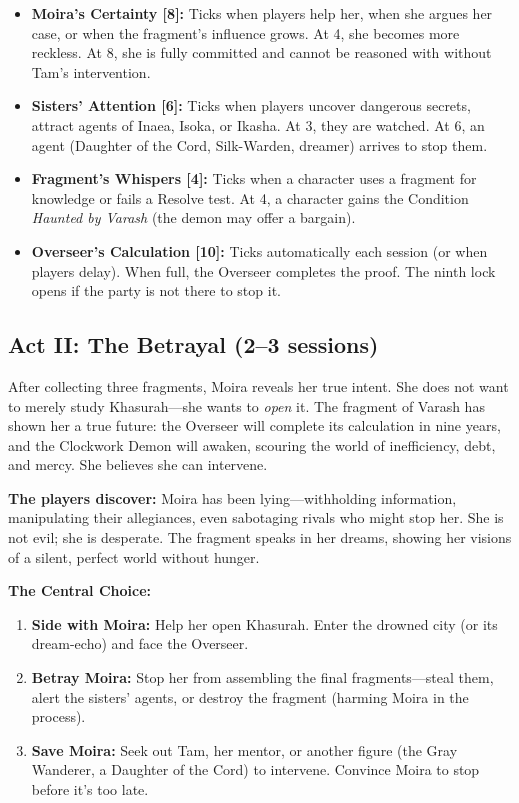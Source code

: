 \documentclass[11pt]{article}
\begin{document}
\begin{itemize}
    \item \textbf{Moira's Certainty [8]:} Ticks when players help her, when she argues her case, or when the fragment's influence grows. At 4, she becomes more reckless. At 8, she is fully committed and cannot be reasoned with without Tam's intervention.
    \item \textbf{Sisters' Attention [6]:} Ticks when players uncover dangerous secrets, attract agents of Inaea, Isoka, or Ikasha. At 3, they are watched. At 6, an agent (Daughter of the Cord, Silk-Warden, dreamer) arrives to stop them.
    \item \textbf{Fragment's Whispers [4]:} Ticks when a character uses a fragment for knowledge or fails a Resolve test. At 4, a character gains the Condition \textit{Haunted by Varash} (the demon may offer a bargain).
    \item \textbf{Overseer's Calculation [10]:} Ticks automatically each session (or when players delay). When full, the Overseer completes the proof. The ninth lock opens if the party is not there to stop it.
\end{itemize}

\subsection{Act II: The Betrayal (2--3 sessions)}

After collecting three fragments, Moira reveals her true intent. She does not want to merely study Khasurah---she wants to \textit{open} it. The fragment of Varash has shown her a true future: the Overseer will complete its calculation in nine years, and the Clockwork Demon will awaken, scouring the world of inefficiency, debt, and mercy. She believes she can intervene.

\textbf{The players discover:} Moira has been lying---withholding information, manipulating their allegiances, even sabotaging rivals who might stop her. She is not evil; she is desperate. The fragment speaks in her dreams, showing her visions of a silent, perfect world without hunger.

\textbf{The Central Choice:}

\begin{enumerate}
    \item \textbf{Side with Moira:} Help her open Khasurah. Enter the drowned city (or its dream-echo) and face the Overseer.
    \item \textbf{Betray Moira:} Stop her from assembling the final fragments---steal them, alert the sisters' agents, or destroy the fragment (harming Moira in the process).
    \item \textbf{Save Moira:} Seek out Tam, her mentor, or another figure (the Gray Wanderer, a Daughter of the Cord) to intervene. Convince Moira to stop before it's too late.
\end{enumerate}
\end{document}

